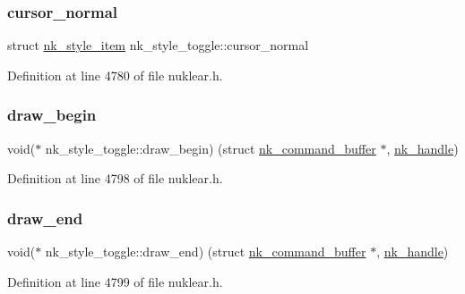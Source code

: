 \subsubsection{\texorpdfstring{cursor\+\_\+normal}{cursor\_normal}}
{\footnotesize\ttfamily struct \mbox{\hyperlink{structnk__style__item}{nk\+\_\+style\+\_\+item}} nk\+\_\+style\+\_\+toggle\+::cursor\+\_\+normal}



Definition at line 4780 of file nuklear.\+h.

\mbox{\label{structnk__style__toggle_aabff3e571b5bfd25c2b6d2d10a90c218}} 
\subsubsection{\texorpdfstring{draw\+\_\+begin}{draw\_begin}}
{\footnotesize\ttfamily void($\ast$ nk\+\_\+style\+\_\+toggle\+::draw\+\_\+begin) (struct \mbox{\hyperlink{structnk__command__buffer}{nk\+\_\+command\+\_\+buffer}} $\ast$, \mbox{\hyperlink{unionnk__handle}{nk\+\_\+handle}})}



Definition at line 4798 of file nuklear.\+h.

\mbox{\label{structnk__style__toggle_a499f50c32b35717f5022272b95764599}} 
\subsubsection{\texorpdfstring{draw\+\_\+end}{draw\_end}}
{\footnotesize\ttfamily void($\ast$ nk\+\_\+style\+\_\+toggle\+::draw\+\_\+end) (struct \mbox{\hyperlink{structnk__command__buffer}{nk\+\_\+command\+\_\+buffer}} $\ast$, \mbox{\hyperlink{unionnk__handle}{nk\+\_\+handle}})}



Definition at line 4799 of file nuklear.\+h.

\mbox{\label{structnk__style__toggle_a153b011fb05353d22a0f05b0ccc1686b}} 

